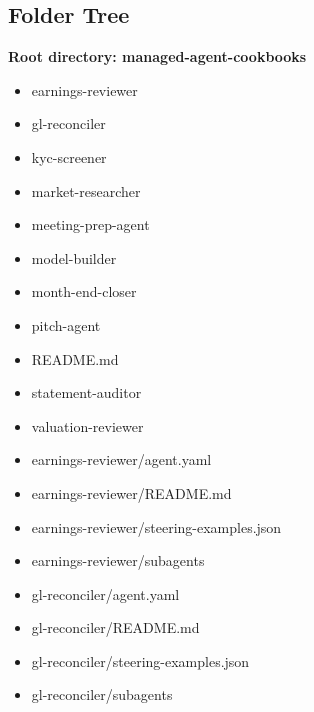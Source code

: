 \documentclass[11pt]{article}
\begin{document}
\subsection{Folder Tree}
\textbf{Root directory: managed-agent-cookbooks}
\begin{itemize}[leftmargin=*,itemsep=1pt,topsep=2pt]
\item \hspace*{0.0em}earnings-reviewer
\item \hspace*{0.0em}gl-reconciler
\item \hspace*{0.0em}kyc-screener
\item \hspace*{0.0em}market-researcher
\item \hspace*{0.0em}meeting-prep-agent
\item \hspace*{0.0em}model-builder
\item \hspace*{0.0em}month-end-closer
\item \hspace*{0.0em}pitch-agent
\item \hspace*{0.0em}README.md
\item \hspace*{0.0em}statement-auditor
\item \hspace*{0.0em}valuation-reviewer
\item \hspace*{0.9em}earnings-reviewer/agent.yaml
\item \hspace*{0.9em}earnings-reviewer/README.md
\item \hspace*{0.9em}earnings-reviewer/steering-examples.json
\item \hspace*{0.9em}earnings-reviewer/subagents
\item \hspace*{0.9em}gl-reconciler/agent.yaml
\item \hspace*{0.9em}gl-reconciler/README.md
\item \hspace*{0.9em}gl-reconciler/steering-examples.json
\item \hspace*{0.9em}gl-reconciler/subagents

\end{itemize}
\end{document}

